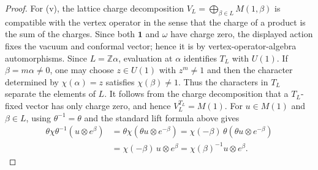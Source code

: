 \documentclass[10pt,a4paper]{amsart}
\numberwithin{equation}{section} \newtheorem{thm}{Theorem}[section] \newtheorem{lem}[thm]{Lemma} \newtheorem{ex}[thm]{Example} \newtheorem{prop}[thm]{Proposition} \newtheorem{cor}[thm]{Corollary} \newtheorem{defi}[thm]{Definition} \newtheorem{rmk}[thm]{Remark} \newtheorem{notation}[thm]{Notation}
\newcommand{\one}{\mathbf{1}}
\begin{document}
\begin{proof}
For \textnormal{(v)}, the lattice charge decomposition $ V_L=\bigoplus_{\beta\in L}M(1,\beta) $ is compatible with the vertex operator in the sense that the charge of a product is the sum of the charges. Since both \(\one\) and \(\omega\) have charge zero, the displayed action fixes the vacuum and conformal vector; hence it is by vertex-operator-algebra automorphisms. Since \(L=\mathbb Z\alpha\), evaluation at \(\alpha\) identifies \(T_L\) with \(U(1)\). If \(\beta=m\alpha\ne0\), one may choose \(z\in U(1)\) with \(z^m\ne1\) and then the character determined by \(\chi(\alpha)=z\) satisfies \(\chi(\beta)\ne1\). Thus the characters in \(T_L\) separate the elements of \(L\). It follows from the charge decomposition that a \(T_L\)-fixed vector has only charge zero, and hence $ V_L^{T_L}=M(1). $ For \(u\in M(1)\) and \(\beta\in L\), using \(\theta^{-1}=\theta\) and the standard lift formula above gives $$
\begin{aligned}
\theta\chi\theta^{-1}(u\otimes e^\beta)
&=\theta\chi(\theta u\otimes e^{-\beta})=\chi(-\beta)\,\theta(\theta u\otimes e^{-\beta})\\
&=\chi(-\beta)\,u\otimes e^\beta=\chi(\beta)^{-1}u\otimes e^\beta.
\end{aligned}
$$
\end{proof}
\end{document}
